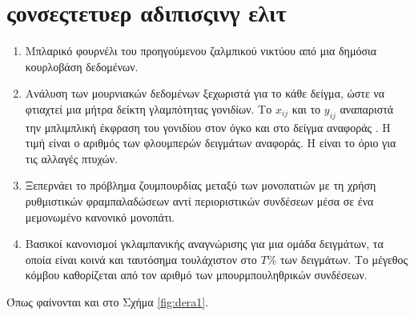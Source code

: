 \chapter{ςονσεςτετυερ αδιπισςινγ ελιτ} \label{par:relworks}

\lipsum[1-3]

\begin{enumerate}
	\item Μπλαρικό φουρνέλι του προηγούμενου ζαλμπικού νικτύου από μια δημόσια κουρλοβάση δεδομένων.
	\item Ανάλυση των μουρνιακών δεδομένων ξεχωριστά για το κάθε δείγμα, ώστε να φτιαχτεί μια μήτρα δείκτη γλαμπότητας γονιδίων. Το $x_{ij}$ και το $y_{ij}$ αναπαριστά την μπλιμπλική έκφραση του γονιδίου  στον όγκο  και στο δείγμα αναφοράς . Η τιμή  είναι ο αριθμός των φλουμπερών δειγμάτων αναφοράς. Η  είναι το όριο για τις αλλαγές πτυχών.
	\item Ξεπερνάει το πρόβλημα ζουμπουρδίας μεταξύ των μονοπατιών με τη χρήση ρυθμιστικών φραμπαλαδώσεων αντί περιοριστικών συνδέσεων μέσα σε ένα μεμονωμένο κανονικό μονοπάτι.
	\item Βασικοί κανονισμοί γκλαμπανικής αναγνώρισης για μια ομάδα δειγμάτων, τα οποία είναι κοινά και ταυτόσημα τουλάχιστον στο $Τ\%$ των δειγμάτων. Το μέγεθος κόμβου καθορίζεται από τον αριθμό των μπουρμπουληθρικών συνδέσεων.
\end{enumerate}

Όπως φαίνονται και στο Σχήμα \ref{fig:dera1}.



